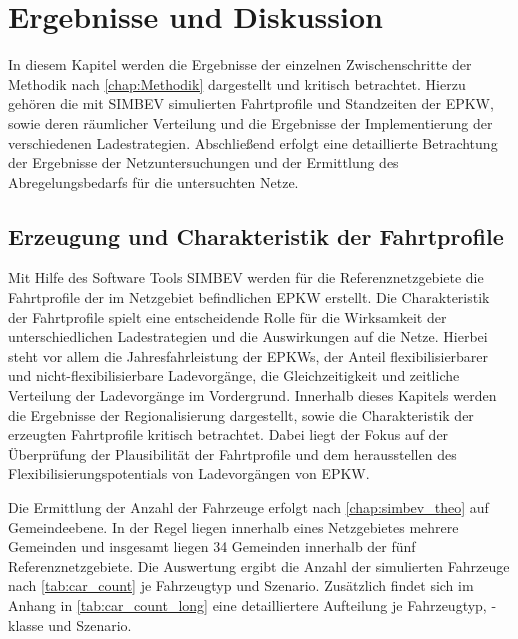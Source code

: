 \section{Ergebnisse und Diskussion}\label{chap:results}

In diesem Kapitel werden die Ergebnisse der einzelnen Zwischenschritte der Methodik nach \autoref{chap:Methodik} dargestellt und kritisch betrachtet.
Hierzu gehören die mit \gls{SIMBEV} simulierten Fahrtprofile und Standzeiten der \gls{EPKW}, sowie deren räumlicher Verteilung und die Ergebnisse der Implementierung der verschiedenen Ladestrategien.
Abschließend erfolgt eine detaillierte Betrachtung der Ergebnisse der Netzuntersuchungen und der Ermittlung des Abregelungsbedarfs für die untersuchten Netze.


\subsection{Erzeugung und Charakteristik der Fahrtprofile}

Mit Hilfe des Software Tools \gls{SIMBEV} werden für die Referenznetzgebiete die Fahrtprofile der im Netzgebiet befindlichen \gls{EPKW} erstellt.
Die Charakteristik der Fahrtprofile spielt eine entscheidende Rolle für die Wirksamkeit der unterschiedlichen Ladestrategien und die Auswirkungen auf die Netze.
Hierbei steht vor allem die Jahresfahrleistung der \glspl{EPKW}, der Anteil flexibilisierbarer und nicht-flexibilisierbare Ladevorgänge, die Gleichzeitigkeit und zeitliche Verteilung der Ladevorgänge im Vordergrund.
Innerhalb dieses Kapitels werden die Ergebnisse der Regionalisierung dargestellt, sowie die Charakteristik der erzeugten Fahrtprofile kritisch betrachtet.
Dabei liegt der Fokus auf der Überprüfung der Plausibilität der Fahrtprofile und dem herausstellen des Flexibilisierungspotentials von Ladevorgängen von \gls{EPKW}.\medskip

Die Ermittlung der Anzahl der Fahrzeuge erfolgt nach \autoref{chap:simbev_theo} auf Gemeindeebene.
In der Regel liegen innerhalb eines Netzgebietes mehrere Gemeinden und insgesamt liegen \num{34} Gemeinden innerhalb der fünf Referenznetzgebiete.
Die Auswertung ergibt die Anzahl der simulierten Fahrzeuge nach \autoref{tab:car_count} je Fahrzeugtyp und Szenario.
Zusätzlich findet sich im Anhang in \autoref{tab:car_count_long} eine detailliertere Aufteilung je Fahrzeugtyp, -klasse und Szenario.



